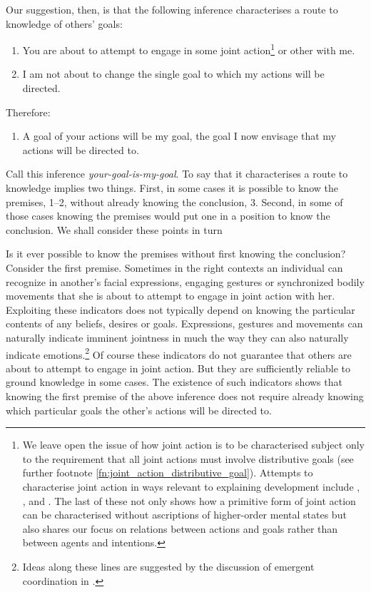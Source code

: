 \documentclass[12pt,\papersize]{extarticle}
\begin{document}
Our suggestion, then, is that the following inference characterises a route to knowledge of others’ goals:
%
\begin{enumerate}
\label{your_goal_is_my_goal}
\item You are 
about to attempt to 
engage in some joint action\footnote{
We leave open the issue of how joint action is to be characterised subject only to the 
requirement that all joint actions must involve distributive goals (see further footnote \vref{fn:joint_action_distributive_goal}).
Attempts to characterise joint action in ways relevant to explaining development include
	\citet{Tollefsen:2005vh},
	\citet{Carpenter:2009wq},
	\citet{pacherie_framing_2011} and
	\citet{Butterfill:2011fk}.
The last of these 
not only shows how a primitive form of joint action can be characterised without ascriptions of higher-order mental states
but also shares our focus on relations between actions and goals rather than between agents and intentions.
}
or other with me.

\item I am not about to change the single goal to which my actions will be directed.

\end{enumerate}
%
Therefore:
%
\begin{enumerate}[resume]
%
\item A goal of your actions will be my goal, the goal I now envisage that my actions will be directed to.
\end{enumerate}
%
Call this inference \emph{your-goal-is-my-goal}.  
To say that it characterises a route to knowledge implies two things.  
First, in some cases it is possible to know the premises, 1–2, without already knowing the conclusion, 3.  
Second, in some of those cases knowing the premises would put one in a position to know the conclusion.  
We shall consider these points in turn


Is it ever possible to know the premises without first knowing the conclusion?  
Consider the first premise.  
Sometimes 
in the right contexts
an individual can recognize in another's facial expressions, engaging gestures or synchronized bodily movements that she is about to attempt to engage in joint action with her.
Exploiting these indicators does not typically depend on knowing the particular contents of any beliefs, desires or goals.  
Expressions, gestures and movements can naturally indicate imminent jointness in much the way they can also naturally indicate emotions.\footnote{
Ideas along these lines are suggested by the discussion of {emergent coordination} in \citet{Knoblich:2010fk}.
}  
Of course these indicators do not guarantee that others are  about to attempt to engage in joint action.  
But they are sufficiently reliable to ground knowledge in some cases.  
The existence of such indicators shows that knowing the first  premise of the above inference does not require already knowing which particular goals the other's actions will be directed to.  
\end{document}
